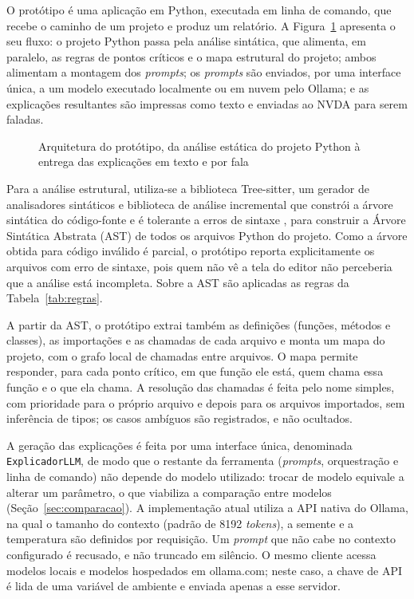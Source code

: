 \documentclass[
    12pt,                   %
    openright,              %
    oneside,                %
    a4paper,                %
    sumario=tradicional,    %
    english,                %
    brazil,                 %
    ]{abntex2}
\begin{document}
O protótipo é uma aplicação em Python, executada em linha de comando, que recebe o caminho de um projeto e produz um relatório. A Figura~\ref{fig:arquitetura} apresenta o seu fluxo: o projeto Python passa pela análise sintática, que alimenta, em paralelo, as regras de pontos críticos e o mapa estrutural do projeto; ambos alimentam a montagem dos \textit{prompts}; os \textit{prompts} são enviados, por uma interface única, a um modelo executado localmente ou em nuvem pelo Ollama; e as explicações resultantes são impressas como texto e enviadas ao NVDA para serem faladas.

\begin{figure}[htbp]
  \centering
  
  \caption{Arquitetura do protótipo, da análise estática do projeto Python à entrega das explicações em texto e por fala}
  \label{fig:arquitetura}
\end{figure}

Para a análise estrutural, utiliza-se a biblioteca Tree-sitter, um gerador de analisadores sintáticos e biblioteca de análise incremental que constrói a árvore sintática do código-fonte e é tolerante a erros de sintaxe \cite{treesitter}, para construir a Árvore Sintática Abstrata (AST) de todos os arquivos Python do projeto. Como a árvore obtida para código inválido é parcial, o protótipo reporta explicitamente os arquivos com erro de sintaxe, pois quem não vê a tela do editor não perceberia que a análise está incompleta. Sobre a AST são aplicadas as regras da Tabela~\ref{tab:regras}.

A partir da AST, o protótipo extrai também as definições (funções, métodos e classes), as importações e as chamadas de cada arquivo e monta um mapa do projeto, com o grafo local de chamadas entre arquivos. O mapa permite responder, para cada ponto crítico, em que função ele está, quem chama essa função e o que ela chama. A resolução das chamadas é feita pelo nome simples, com prioridade para o próprio arquivo e depois para os arquivos importados, sem inferência de tipos; os casos ambíguos são registrados, e não ocultados.

A geração das explicações é feita por uma interface única, denominada \texttt{Explicador\-LLM}, de modo que o restante da ferramenta (\textit{prompts}, orquestração e linha de comando) não depende do modelo utilizado: trocar de modelo equivale a alterar um parâmetro, o que viabiliza a comparação entre modelos (Seção~\ref{sec:comparacao}). A implementação atual utiliza a API nativa do Ollama, na qual o tamanho do contexto (padrão de 8192 \textit{tokens}), a semente e a temperatura são definidos por requisição. Um \textit{prompt} que não cabe no contexto configurado é recusado, e não truncado em silêncio. O mesmo cliente acessa modelos locais e modelos hospedados em ollama.com; neste caso, a chave de API é lida de uma variável de ambiente e enviada apenas a esse servidor.
\end{document}
